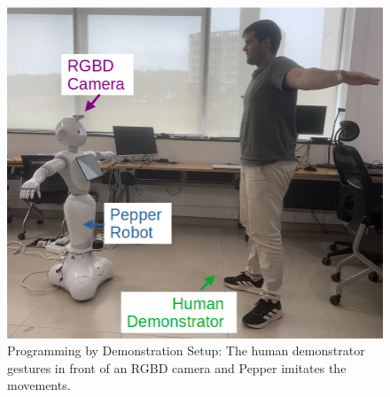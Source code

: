 \documentclass{CSSRforAfrica}
\begin{document}
\vspace{0.1cm}
\begin{figure}[ht!]
    \centering
    \includegraphics[width=13cm]{figures/setupPepper.png}
    \captionsetup{width=13cm}
    \caption{Programming by Demonstration Setup: The human demonstrator gestures in front of an RGBD camera and Pepper imitates the movements. }
    \label{fig:setup}
\end{figure}


 \newpage
\end{document}
